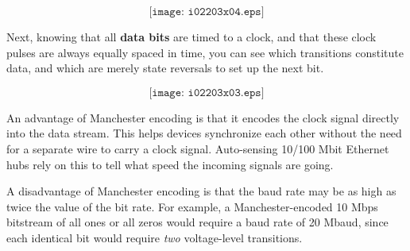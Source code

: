 $$\texttt{[image: i02203x04.eps]}$$

Next, knowing that all {\bf data bits} are timed to a clock, and that these clock pulses are always equally spaced in time, you can see which transitions constitute data, and which are merely state reversals to set up the next bit.

$$\texttt{[image: i02203x03.eps]}$$

\vskip 10pt

An advantage of Manchester encoding is that it encodes the clock signal directly into the data stream.  This helps devices synchronize each other without the need for a separate wire to carry a clock signal.  Auto-sensing 10/100 Mbit Ethernet hubs rely on this to tell what speed the incoming signals are going.

\vskip 10pt

A disadvantage of Manchester encoding is that the baud rate may be as high as twice the value of the bit rate.  For example, a Manchester-encoded 10 Mbps bitstream of all ones or all zeros would require a baud rate of 20 Mbaud, since each identical bit would require {\it two} voltage-level transitions.












